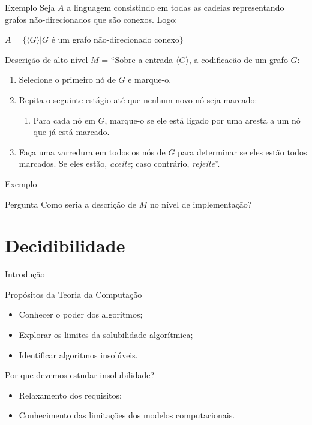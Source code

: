 \documentclass[xcolor=dvipsnames,table]{beamer}
\begin{document}
	\begin{frame}[shrink]{Exemplo}
		Seja $A$ a linguagem consistindo em todas as cadeias representando grafos não-direcionados que são conexos. Logo:
		\begin{center}
			$A = \{\langle G \rangle | G$ é um grafo não-direcionado conexo$\}$
		\end{center}\pause		
		\begin{block}{Descrição de alto nível}
			$M$ = ``Sobre a entrada $\langle G \rangle$, a codificacão de um grafo $G$:
			\begin{enumerate}
				\item Selecione o primeiro nó de $G$ e marque-o.
				\item Repita o seguinte estágio até que nenhum novo nó seja marcado:
				\begin{enumerate}
					\item Para cada nó em $G$, marque-o se ele está ligado por uma aresta a um nó que já está marcado.
				\end{enumerate}
				\item Faça uma varredura em todos os nós de $G$ para determinar se eles estão todos marcados. Se eles estão, {\it aceite}; caso contrário, {\it rejeite}''.
			\end{enumerate}
		\end{block}
	\end{frame}
	
	\begin{frame}{Exemplo}
		\begin{block}{Pergunta}
			Como seria a descrição de $M$ no nível de implementação?
		\end{block}
	\end{frame}
	
	\section{Decidibilidade}
	\begin{frame}{Introdução}
		\begin{block}{Propósitos da Teoria da Computação}
			\begin{itemize}
				\item Conhecer o poder dos algoritmos;
				\item Explorar os limites da solubilidade algorítmica;
				\item Identificar algoritmos insolúveis.
			\end{itemize}
		\end{block}  \pause
		\begin{block}{Por que devemos estudar insolubilidade?}
			\begin{itemize}
				\item Relaxamento dos requisitos;
				\item Conhecimento das limitações dos modelos computacionais.
			\end{itemize}
		\end{block}
	\end{frame}
\end{document}
